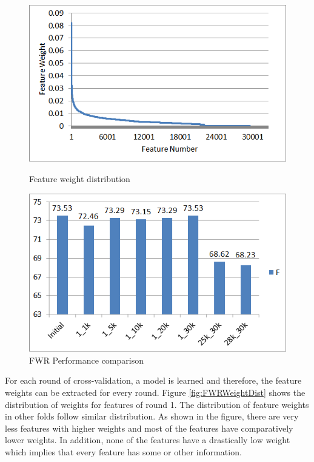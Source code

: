 \begin{figure}
\centering
\begin{minipage}{.5\textwidth}
  \centering
  \includegraphics[width=.95\textwidth]{figures/FWRWeightDist.png}
  \caption{Feature weight distribution}
  \label{fig:FWRWeightDist}
\end{minipage}%
\begin{minipage}{.5\textwidth}
  \centering
  \includegraphics[width=.95\textwidth]{figures/FWRPerformance.png}
  \caption{FWR Performance comparison}
  \label{fig:FWRPerfComp}
\end{minipage}
\end{figure} 

For each round of cross-validation, a model is learned and therefore, the feature weights can be extracted for every round. Figure \ref{fig:FWRWeightDist} shows the distribution of weights for features of round 1. The distribution of feature weights in other folds follow similar distribution. As shown in the figure, there are very less features with higher weights and most of the features have comparatively lower weights. In addition, none of the features have a drastically low weight which implies that every feature has some or other information.

